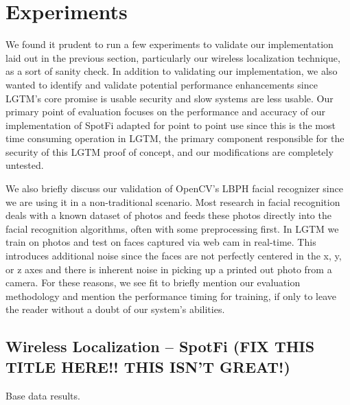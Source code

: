 \documentclass[12pt]{report}
\begin{document}
\chapter{Experiments}
We found it prudent to run a few experiments to validate our implementation laid out in the previous section, particularly our wireless localization technique, as a sort of sanity check. In addition to validating our implementation, we also wanted to identify and validate potential performance enhancements since LGTM's core promise is usable security and slow systems are less usable. Our primary point of evaluation focuses on the performance and accuracy of our implementation of SpotFi adapted for point to point use since this is the most time consuming operation in LGTM, the primary component responsible for the security of this LGTM proof of concept, and our modifications are completely untested. \par

We also briefly discuss our validation of OpenCV's LBPH facial recognizer since we are using it in a non-traditional scenario. Most research in facial recognition deals with a known dataset of photos and feeds these photos directly into the facial recognition algorithms, often with some preprocessing first. In LGTM we train on photos and test on faces captured via web cam in real-time. This introduces additional noise since the faces are not perfectly centered in the x, y, or z axes and there is inherent noise in picking up a printed out photo from a camera. For these reasons, we see fit to briefly mention our evaluation methodology and mention the performance timing for training, if only to leave the reader without a doubt of our system's abilities. \par

\section{Wireless Localization -- SpotFi (FIX THIS TITLE HERE!! THIS ISN'T GREAT!)}

\begin{table}
    \begin{center}
        \caption{Base data results.}
        \label{table: base-data-table}
                
    \end{center}
\end{table}
\end{document}
